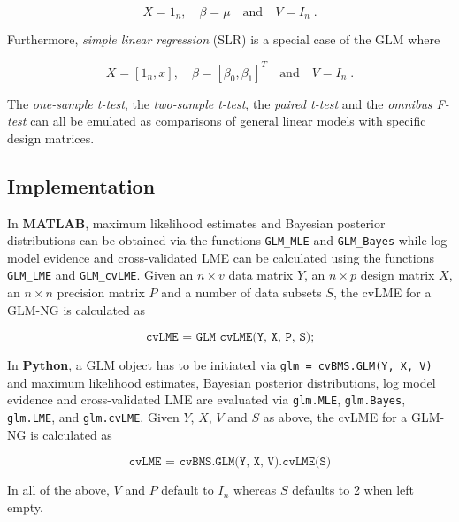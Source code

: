 \begin{equation} \label{eq:GLM-NG-UGuv}
X = 1_n,  \quad \beta = \mu \quad \text{and} \quad V = I_n \; .
\end{equation}

Furthermore, \textit{simple linear regression} (SLR) is a special case of the GLM where

\begin{equation} \label{eq:GLM-NG-SLR}
X = [1_n, x],  \quad \beta = [\beta_0, \beta_1]^T \quad \text{and} \quad V = I_n \; .
\end{equation}

The \textit{one-sample t-test}, the \textit{two-sample t-test}, the \textit{paired t-test} and the \textit{omnibus F-test} can all be emulated as comparisons of general linear models with specific design matrices.


\subsection{Implementation} \label{sec:GLM-Imp}

In \textbf{MATLAB}, maximum likelihood estimates and Bayesian posterior distributions can be obtained via the functions \verb|GLM_MLE| and \verb|GLM_Bayes| while log model evidence and cross-validated LME can be calculated using the functions \verb|GLM_LME| and \verb|GLM_cvLME|. Given an $n \times v$ data matrix $Y$, an $n \times p$ design matrix $X$, an $n \times n$ precision matrix $P$ and a number of data subsets $S$, the cvLME for a GLM-NG is calculated as

\begin{equation} \label{eq:GLM-NG-cvLME-MATLAB}
\texttt{cvLME = GLM\_cvLME(Y, X, P, S);}
\end{equation}

In \textbf{Python}, a GLM object has to be initiated via \verb|glm = cvBMS.GLM(Y, X, V)| and maximum likelihood estimates, Bayesian posterior distributions, log model evidence and cross-validated LME are evaluated via \verb|glm.MLE|, \verb|glm.Bayes|, \verb|glm.LME|, and \verb|glm.cvLME|. Given $Y$, $X$, $V$ and $S$ as above, the cvLME for a GLM-NG is calculated as

\begin{equation} \label{eq:GLM-NG-cvLME-Python}
\texttt{cvLME = cvBMS.GLM(Y, X, V).cvLME(S)}
\end{equation}

In all of the above, $V$ and $P$ default to $I_n$ whereas $S$ defaults to 2 when left empty.